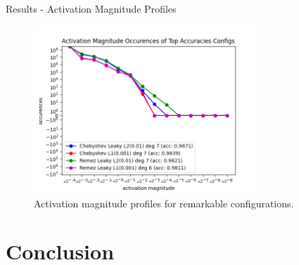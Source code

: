 \documentclass[9pt]{beamer}
\begin{document}
\begin{frame}{Results - Activation Magnitude Profiles}
    \begin{figure}[!h]
        \centering
        \includegraphics[width=0.75\textwidth]{resource/tops_profile.png}
        \caption{Activation magnitude profiles for remarkable configurations.}
        \label{fig:affects_top_acc_profile}
    \end{figure}
\end{frame}

\section{Conclusion}
\end{document}

